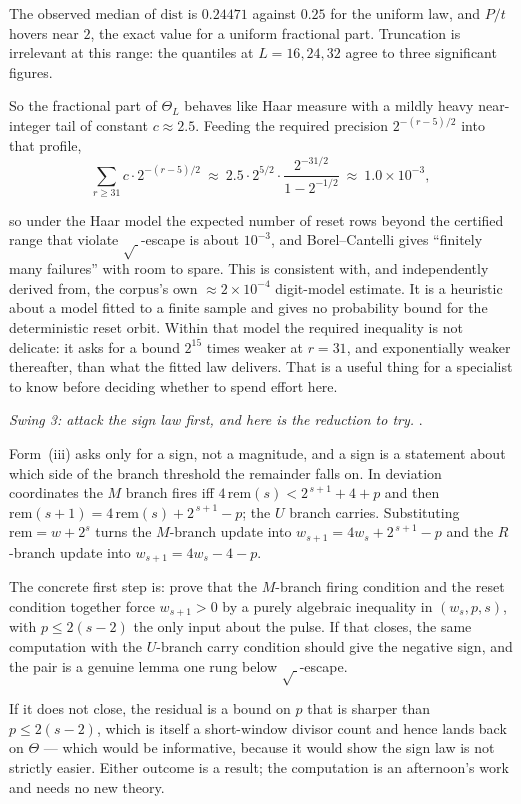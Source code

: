 The observed median of $\mathrm{dist}$ is $0.24471$ against $0.25$ for the uniform law, and
$P/t$ hovers near $2$, the exact value for a uniform fractional part. Truncation is irrelevant at
this range: the quantiles at $L=16,24,32$ agree to three significant figures.

So the fractional
part of $\Theta_L$ behaves like Haar measure with a mildly heavy near-integer tail of constant
$c\approx 2.5$. Feeding the required precision $2^{-(r-5)/2}$ into that profile,
\[
\sum_{r\ge 31} c\cdot 2^{-(r-5)/2}\ \approx\ 2.5\cdot 2^{5/2}\cdot\frac{2^{-31/2}}{1-2^{-1/2}}
\ \approx\ 1.0\times 10^{-3},
\]

so under the Haar model the expected number of reset rows beyond the certified range that violate
$\sqrt{\ }$-escape is about $10^{-3}$, and Borel--Cantelli gives ``finitely many failures'' with
room to spare. This is consistent with, and independently derived from, the corpus's own
$\approx 2\times10^{-4}$ digit-model estimate. It is a heuristic about a model fitted to a finite
sample and gives no probability bound for the deterministic reset orbit. Within that model the
required inequality is not delicate: it asks for a bound $2^{15}$ times weaker at
$r=31$, and exponentially weaker thereafter, than what the fitted law delivers. That is a
useful thing for a specialist to know before deciding whether to spend effort here.

\emph{Swing 3: attack the sign law first, and here is the reduction to try.} .

Form~(iii) asks only for a sign, not a magnitude, and a sign is a statement about which side of
the branch threshold the remainder falls on. In deviation coordinates the $M$ branch fires iff
$4\,\mathrm{rem}(s)<2^{\,s+1}+4+p$ and then $\mathrm{rem}(s+1)=4\,\mathrm{rem}(s)+2^{\,s+1}-p$;
the $U$ branch carries. Substituting $\mathrm{rem}=w+2^{s}$ turns the $M$-branch update into
$w_{s+1}=4w_s+2^{\,s+1}-p$ and the $R$-branch update into $w_{s+1}=4w_s-4-p$.

The concrete first
step is: prove that the $M$-branch firing condition and the reset condition together force
$w_{s+1}>0$ by a purely algebraic inequality in $(w_s,p,s)$, with $p\le 2(s-2)$ the only input
about the pulse. If that closes, the same computation with the $U$-branch carry condition should
give the negative sign, and the pair is a genuine lemma one rung below $\sqrt{\ }$-escape.

If it
does not close, the residual is a bound on $p$ that is sharper than $p\le2(s-2)$, which is itself
a short-window divisor count and hence lands back on $\Theta$ --- which would be informative,
because it would show the sign law is not strictly easier. Either outcome is a result; the
computation is an afternoon's work and needs no new theory.

